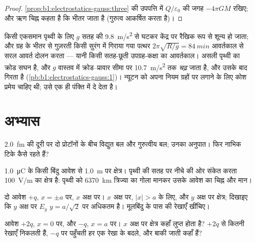 \begin{proof}
\cref{prop:b1:electrostatics-gauss:three} की उपपत्ति में $Q/\varepsilon_0$ की जगह
$-4\pi GM$ रखिए; और ऋण चिह्न कहता है कि  भीतर जाता है (गुरुत्व
आकर्षित करता है)।
\end{proof}

\begin{example}[पृथ्वी के भीतर]\label{ex:b1:electrostatics-gauss:earth}
किसी एकसमान पृथ्वी के लिए $g$ सतह की \qty{9.8}{m/s^2} से घटकर केंद्र पर
रैखिक रूप से शून्य हो जाता; और ग्रह के भीतर से गुज़रती किसी सुरंग में गिराया गया
पत्थर $2\pi\sqrt{R/g} =
\qty{84}{min}$ आवर्तकाल से सरल आवर्त दोलन करता --- यानी किसी सतह-छूती
उपग्रह-कक्षा का आवर्तकाल। असली पृथ्वी का क्रोड सघन है, और $g$ वास्तव में
क्रोड--प्रावार सीमा पर \qty{10.7}{m/s^2} तक \emph{चढ़} जाता है, और उसके बाद
गिरता है (\cref{pb:b1:electrostatics-gauss:1})। न्यूटन को अपना नियम ग्रहों
पर लगाने के लिए कोश प्रमेय चाहिए थी;  उसे एक ही पंक्ति में दे
देता है।
\end{example}

\section{अभ्यास}

\begin{exercise}[$\star$]\label{exo:b1:electrostatics-gauss:1}
\qty{2.0}{fm} की दूरी पर दो प्रोटॉनों के बीच विद्युत बल और गुरुत्वीय बल;
उनका अनुपात। फिर नाभिक टिके कैसे रहते हैं?
\end{exercise}

\begin{exercise}[$\star$]\label{exo:b1:electrostatics-gauss:2}
\qty{1.0}{\micro C} के किसी बिंदु आवेश से \qty{1.0}{m} पर क्षेत्र। पृथ्वी
की सतह पर नीचे की ओर संकेत करता \qty{100}{V/m} का क्षेत्र है: पृथ्वी को
\qty{6370}{km} त्रिज्या का गोला मानकर उसके आवेश का चिह्न और मान।
\end{exercise}

\begin{exercise}[$\star$]\label{exo:b1:electrostatics-gauss:3}
दो आवेश $+q$, $x = \pm a$ पर, $x$ अक्ष पर। $x$ अक्ष पर, $|x| > a$ के लिए,
और $y$ अक्ष पर क्षेत्र; दिखाइए कि $y$ अक्ष पर $E_y$
$y = a/\sqrt2$ पर अधिकतम है। मूलबिंदु के पास की रेखाएँ खींचिए।
\end{exercise}

\begin{exercise}[$\star$]\label{exo:b1:electrostatics-gauss:4}
आवेश $+2q$, $x = 0$ पर, और $-q$, $x = a$ पर। $x$ अक्ष पर क्षेत्र कहाँ लुप्त
होता है? $+2q$ से कितनी रेखाएँ निकलती हैं, $-q$ पर पहुँचती हर एक रेखा के
बदले, और बाकी जाती कहाँ हैं?
\end{exercise}

